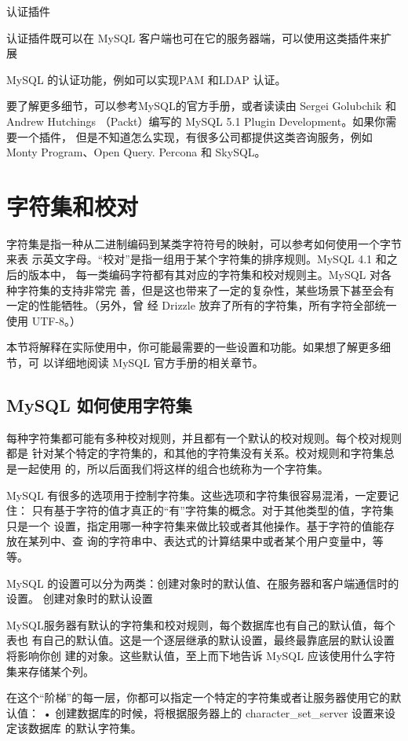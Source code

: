认证插件

认证插件既可以在 MySQL 客户端也可在它的服务器端，可以使用这类插件来扩展

MySQL 的认证功能，例如可以实现PAM 和LDAP 认证。

要了解更多细节，可以参考MySQL的官方手册，或者读读由 Sergei Golubchik 和
Andrew Hutchings （Packt）编写的 MySQL 5.1 Plugin Development。如果你需要一个插件，
但是不知道怎么实现，有很多公司都提供这类咨询服务，例如 Monty Program、Open
Query. Percona 和 SkySQL。

\section{字符集和校对}
字符集是指一种从二进制编码到某类字符符号的映射，可以参考如何使用一个字节来表
示英文字母。“校对”是指一组用于某个字符集的排序规则。MySQL 4.1 和之后的版本中，
每一类编码字符都有其对应的字符集和校对规则主。MySQL 对各种字符集的支持非常完
善，但是这也带来了一定的复杂性，某些场景下甚至会有一定的性能牺牲。（另外，曾
经 Drizzle 放弃了所有的字符集，所有字符全部统一使用 UTF-8。）

本节将解释在实际使用中，你可能最需要的一些设置和功能。如果想了解更多细节，可
以详细地阅读 MySQL 官方手册的相关章节。

\subsection{MySQL 如何使用字符集}
每种字符集都可能有多种校对规则，并且都有一个默认的校对规则。每个校对规则都是
针对某个特定的字符集的，和其他的字符集没有关系。校对规则和字符集总是一起使用
的，所以后面我们将这样的组合也统称为一个字符集。

MySQL 有很多的选项用于控制字符集。这些选项和字符集很容易混淆，一定要记住：
只有基于字符的值才真正的“有”字符集的概念。对于其他类型的值，字符集只是一个
设置，指定用哪一种字符集来做比较或者其他操作。基于字符的值能存放在某列中、查
询的字符串中、表达式的计算结果中或者某个用户变量中，等等。

MySQL 的设置可以分为两类：创建对象时的默认值、在服务器和客户端通信时的设置。
创建对象时的默认设置

MySQL服务器有默认的字符集和校对规则，每个数据库也有自己的默认值，每个表也
有自己的默认值。这是一个逐层继承的默认设置，最终最靠底层的默认设置将影响你创
建的对象。这些默认值，至上而下地告诉 MySQL 应该使用什么字符集来存储某个列。

在这个“阶梯”的每一层，你都可以指定一个特定的字符集或者让服务器使用它的默认值：
• 创建数据库的时候，将根据服务器上的 character\_set\_server 设置来设定该数据库
的默认字符集。

